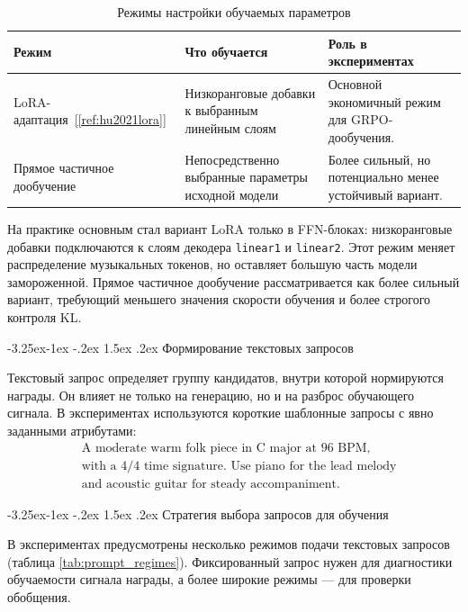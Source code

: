 \documentclass[a4paper,12pt]{extarticle}
\makeatletter
\newcommand{\sourcecite}[1]{\hyperref[#1]{[\ref*{#1}]}}
\renewcommand\subsection{\@startsection{subsection}{2}{\z@}%
  {-3.25ex\@plus -1ex \@minus -.2ex}%
  {1.5ex \@plus .2ex}%
  {\normalfont\large\bfseries\Needspace{6\baselineskip}}}
\makeatother
\begin{document}
\begin{table}[ht]
\centering
\caption{Режимы настройки обучаемых параметров}
\label{tab:adaptation_modes}
\begin{tabular}{|p{}|p{}|p{}|}
\hline
\textbf{Режим} & \textbf{Что обучается} & \textbf{Роль в экспериментах} \\
\hline
LoRA-адаптация~\sourcecite{ref:hu2021lora} & Низкоранговые добавки к выбранным линейным слоям & Основной экономичный режим для GRPO-дообучения. \\
\hline
Прямое частичное дообучение & Непосредственно выбранные параметры исходной модели & Более сильный, но потенциально менее устойчивый вариант. \\
\hline
\end{tabular}
\end{table}

На практике основным стал вариант LoRA только в FFN-блоках:
низкоранговые добавки подключаются к слоям декодера \texttt{linear1} и
\texttt{linear2}. Этот режим меняет распределение музыкальных токенов,
но оставляет большую часть модели замороженной. Прямое частичное
дообучение рассматривается как более сильный вариант, требующий меньшего
значения скорости обучения и более строгого контроля KL.

\subsection{Формирование текстовых запросов}

Текстовый запрос определяет группу кандидатов, внутри которой нормируются награды.
Он влияет не только на генерацию, но и на разброс обучающего
сигнала. В экспериментах используются короткие шаблонные запросы с
явно заданными атрибутами:
\[
\begin{aligned}
&\text{A moderate warm folk piece in C major at 96 BPM,}\\
&\text{with a 4/4 time signature. Use piano for the lead melody}\\
&\text{and acoustic guitar for steady accompaniment.}
\end{aligned}
\]

\subsection{Стратегия выбора запросов для обучения}

В экспериментах предусмотрены несколько режимов подачи текстовых запросов
(таблица \ref{tab:prompt_regimes}). Фиксированный запрос нужен для
диагностики обучаемости сигнала награды, а более широкие режимы --- для
проверки обобщения.
\end{document}
